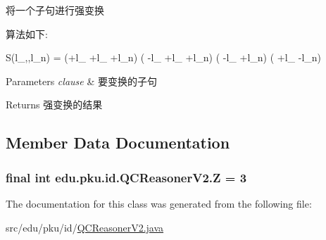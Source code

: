 \label{classedu_1_1pku_1_1id_1_1_q_c_reasoner_v2_a58d1acccb28e5b185e6af32958deff3b}
将一个子句进行强变换\par
 算法如下:\par
 S(l\_,,l\_\-n) = (+l\_  +l\_   +l\_\-n)  ( -\/l\_  +l\_   +l\_\-n)  (   -\/l\_   +l\_\-n)    (  +l\_    -\/l\_\-n) 
\begin{DoxyParams}{Parameters}
{\em clause} & 要变换的子句 \\
\hline
\end{DoxyParams}
\begin{DoxyReturn}{Returns}
强变换的结果 
\end{DoxyReturn}


\subsection{Member Data Documentation}
\hypertarget{classedu_1_1pku_1_1id_1_1_q_c_reasoner_v2_af2c8bff8769fa861fbb3d224d8fdf7c3}{
\subsubsection[{Z}]{\setlength{\rightskip}{0pt plus 5cm}final int {\bf edu.pku.id.QCReasonerV2.Z} = 3}}
\label{classedu_1_1pku_1_1id_1_1_q_c_reasoner_v2_af2c8bff8769fa861fbb3d224d8fdf7c3}


The documentation for this class was generated from the following file:\begin{DoxyCompactItemize}
\item 
src/edu/pku/id/\hyperlink{_q_c_reasoner_v2_8java}{QCReasonerV2.java}\end{DoxyCompactItemize}
